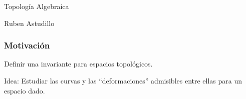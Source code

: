 \documentclass[xetex,mathserif,serif]{beamer}
\begin{document}
  \begin{frame}
    \begin{center}
      \begin{block}{}
        Topología Algebraica
      \end{block}
      \begin{block}{}
        Ruben Astudillo
      \end{block}
    \end{center}

  \end{frame}

  \begin{frame}
    \frametitle{Motivación}

    \begin{block}{}
      Definir una invariante para espacios topológicos.
    \end{block}

    \pause

    \begin{block}{}
      Idea: Estudiar las curvas y las ``deformaciones'' admisibles entre
      ellas para un espacio dado.
    \end{block}
  \end{frame}
\end{document}
